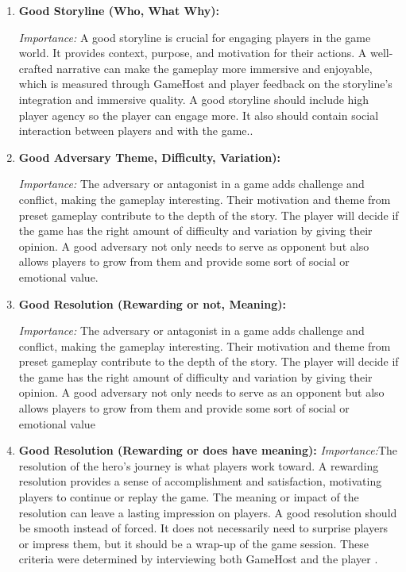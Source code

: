 \documentclass[10pt,twocolumn]{article}
\begin{document}
\begin{enumerate}
    \item \textbf{Good Storyline (Who, What Why):}
    
    \textit{Importance:}  A good storyline is crucial for engaging players in the game world. It provides context, purpose, and motivation for their actions.	A well-crafted narrative can make the gameplay more immersive and enjoyable, which is measured through GameHost and player feedback on the storyline’s integration and immersive quality. A good storyline should include high player agency so the player can engage more. It also should contain social interaction between players and with the game.. \cite{reddit_dnd_campaign_fun}
    
    \item \textbf{Good Adversary  Theme, Difficulty, Variation):}
    
    \textit{Importance:} The adversary or antagonist in a game adds challenge and conflict, making the gameplay interesting. Their motivation and theme from preset gameplay contribute to the depth of the story. The player will decide if the game has the right amount of difficulty and variation by giving their opinion. A good adversary not only needs to serve as opponent but also allows players to grow from them and provide some sort of social or emotional value.  \cite{reddit_dnd_campaign_fun}    
    \item \textbf{Good Resolution (Rewarding or not, Meaning):}
    
    \textit{Importance:} The adversary or antagonist in a game adds challenge and conflict, making the gameplay interesting. Their motivation and theme from preset gameplay contribute to the depth of the story. The player will decide if the game has the right amount of difficulty and variation by giving their opinion. A good adversary not only needs to serve as an opponent but also allows players to grow from them and provide some sort of social or emotional value \cite{reddit_dmacademy_oneshot}
    \item \textbf{Good Resolution (Rewarding or does  have meaning):}
    \textit{Importance:}The resolution of the hero’s journey is what players work toward. A rewarding resolution provides a sense of accomplishment and satisfaction, motivating players to continue or replay the game. The meaning or impact of the resolution can leave a lasting impression on players. A good resolution should be smooth instead of forced. It does not necessarily need to surprise players or impress them, but it should be a wrap-up of the game session. These criteria were determined by interviewing both GameHost and the player
.


\end{enumerate}
\end{document}
